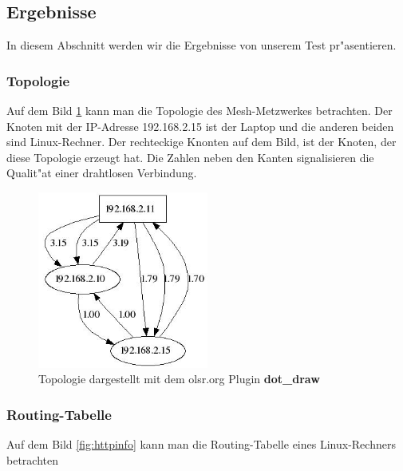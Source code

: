 \subsection{Ergebnisse}

In diesem Abschnitt werden wir die Ergebnisse von unserem Test pr"asentieren.

\subsubsection{Topologie}

Auf dem Bild \ref{fig:Topology} kann man die Topologie des Mesh-Metzwerkes
betrachten. Der Knoten mit der IP-Adresse 192.168.2.15 ist der Laptop und
die anderen beiden sind Linux-Rechner. Der rechteckige Knonten auf dem Bild, ist
der Knoten, der diese Topologie erzeugt hat. Die Zahlen neben den Kanten
signalisieren die Qualit"at einer drahtlosen Verbindung.

\begin{figure}[H]
\centering
\includegraphics[width=0.5\textwidth]{images/Topology.jpg}
\caption{Topologie dargestellt mit dem olsr.org Plugin \textbf{dot\_draw}}
\label{fig:Topology}
\end{figure}

\subsubsection{Routing-Tabelle}

Auf dem Bild \ref{fig:httpinfo} kann man die Routing-Tabelle
eines Linux-Rechners betrachten

